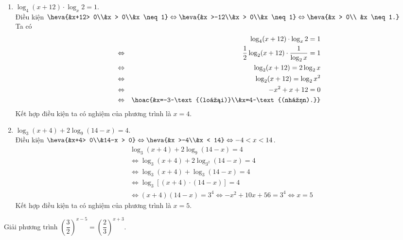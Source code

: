 \begin{bt}
{\begin{enumerate}
			\item $\log_4(x+12) \cdot \log_x  2=1$.\\
			Điều kiện $\heva{&x+12> 0\\&x > 0\\&x \neq 1} \Leftrightarrow \heva{&x >-12\\&x > 0\\&x  \neq 1}\Leftrightarrow \heva{&x > 0\\
			&x \neq 1.}$\\ 
			Ta có 
			\allowdisplaybreaks 
			\begin{eqnarray*}
				 && \log_4(x+12) \cdot \log_x 2=1
				 \\
				 &\Leftrightarrow& \dfrac{1}{2} \log_2(x+12) \cdot \dfrac{1}{\log_2 x}=1
				\\ 
				&\Leftrightarrow& \log_2(x+12)=2 \log_2  x
				\\ 
				&\Leftrightarrow& \log_2(x+12)=\log_2 x^2 
				\\ 
				 &\Leftrightarrow&-x^2+x+12=0
				\\ 
				 &\Leftrightarrow&\hoac{&x=-3~\text{(loại)}\\&x=4~\text{(nhận).}}
			\end{eqnarray*}
			Kết hợp điều kiện ta có nghiệm của phương trình  là $x=4$.
			 \item $\log_3(x+4)+2\log_9(14-x)=4$.\\
			Điều kiện $\heva{&x+4> 0\\&14-x > 0} \Leftrightarrow\heva{&x >-4\\&x <  14} \Leftrightarrow-4< x < 14$.
			 $$
			\begin{aligned}
				& \log_3(x+4)+2\log_9(14-x)=4  \\
				 & \Leftrightarrow \log_3(x+4)+2 \log _{3^2}(14-x)=4 \\
				&  \Leftrightarrow \log_3(x+4)+\log_3(14-x)=4 \\
				& \Leftrightarrow  \log_3[(x+4) \cdot(14-x)]=4 \\
				 & \Leftrightarrow(x+4)(14-x)=3^4 \Leftrightarrow-x^2+10 x+56=3^4 \Leftrightarrow x=5
			\end{aligned}
			 $$
			Kết hợp điều kiện ta có nghiệm của phương trình  là $x=5$.
		\end{enumerate}
	} 
\end{bt}

\begin{bt}%
	Giải phương  trình $\left(\dfrac{3}{2} \right)^{x-5}=\left(\dfrac{2}{3} \right)^{x+3}$.
\end{bt}

